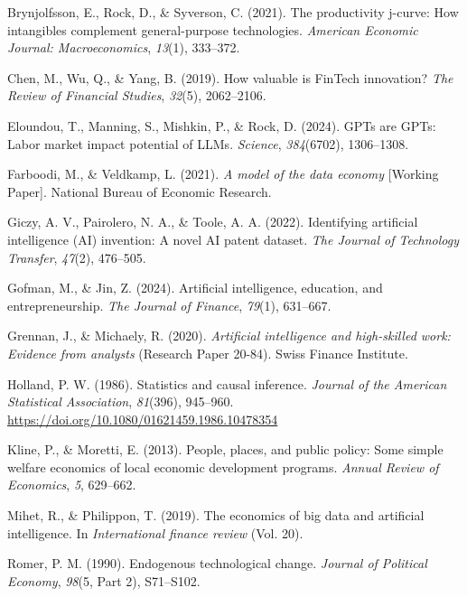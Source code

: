 \documentclass[
]{article}
\newlength{\cslhangindent}
\newenvironment{CSLReferences}[2] %
 {\begin{list}{}{%
  \setlength{\itemindent}{0pt}
  \setlength{\leftmargin}{0pt}
  \setlength{\parsep}{0pt}
  \ifodd #1
   \setlength{\leftmargin}{\cslhangindent}
   \setlength{\itemindent}{-1\cslhangindent}
  \fi
  \setlength{\itemsep}{#2\baselineskip}}}
 {\end{list}}
\begin{document}
\begin{CSLReferences}{1}{0}
Brynjolfsson, E., Rock, D., \& Syverson, C. (2021). The productivity
j-curve: How intangibles complement general-purpose technologies.
\emph{American Economic Journal: Macroeconomics}, \emph{13}(1),
333--372.

Chen, M., Wu, Q., \& Yang, B. (2019). How valuable is FinTech
innovation? \emph{The Review of Financial Studies}, \emph{32}(5),
2062--2106.

Eloundou, T., Manning, S., Mishkin, P., \& Rock, D. (2024). GPTs are
GPTs: Labor market impact potential of LLMs. \emph{Science},
\emph{384}(6702), 1306--1308.

Farboodi, M., \& Veldkamp, L. (2021). \emph{A model of the data economy}
{[}Working Paper{]}. National Bureau of Economic Research.

Giczy, A. V., Pairolero, N. A., \& Toole, A. A. (2022). Identifying
artificial intelligence (AI) invention: A novel AI patent dataset.
\emph{The Journal of Technology Transfer}, \emph{47}(2), 476--505.

Gofman, M., \& Jin, Z. (2024). Artificial intelligence, education, and
entrepreneurship. \emph{The Journal of Finance}, \emph{79}(1), 631--667.

Grennan, J., \& Michaely, R. (2020). \emph{Artificial intelligence and
high-skilled work: Evidence from analysts} (Research Paper 20-84). Swiss
Finance Institute.

Holland, P. W. (1986). Statistics and causal inference. \emph{Journal of
the American Statistical Association}, \emph{81}(396), 945--960.
\url{https://doi.org/10.1080/01621459.1986.10478354}

Kline, P., \& Moretti, E. (2013). People, places, and public policy:
Some simple welfare economics of local economic development programs.
\emph{Annual Review of Economics}, \emph{5}, 629--662.

Mihet, R., \& Philippon, T. (2019). The economics of big data and
artificial intelligence. In \emph{International finance review} (Vol.
20).

Romer, P. M. (1990). Endogenous technological change. \emph{Journal of
Political Economy}, \emph{98}(5, Part 2), S71--S102.


\end{CSLReferences}
\end{document}

